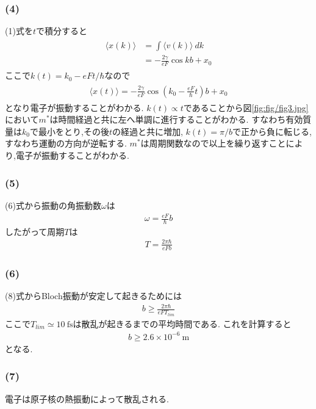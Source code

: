 \documentclass[uplatex,a4j,11pt,dvipdfmx]{jsarticle}
\begin{document}
\subsubsection*{(4)}
(1)式を$t$で積分すると
\begin{align}
  \begin{split}
    \langle x(k)\rangle&=\int\langle v(k)\rangle\ dk\\
    &=-\frac{2\gamma}{eF}\cos kb+x_0
  \end{split}
\end{align}
ここで$k(t)=k_0-eFt/\hbar$なので
\begin{align}
  \begin{split}
    \langle x(t)\rangle=-\frac{2\gamma}{eF}\cos \left(k_0-\frac{eF}{\hbar}t\right)b+x_0
  \end{split}
\end{align}
となり電子が振動することがわかる.
$k(t)\propto t$であることから図\ref{fig:fig/fig3.jpg}において$m^*$は時間経過と共に左へ単調に進行することがわかる.
すなわち有効質量は$k_0$で最小をとり,その後$t$の経過と共に増加,
$k(t)=\pi/b$で正から負に転じる,すなわち運動の方向が逆転する.
$m^*$は周期関数なので以上を繰り返すことにより,電子が振動することがわかる.
\subsubsection*{(5)}
(6)式から振動の角振動数$\omega$は
\begin{align}
  \omega=\frac{eF}{\hbar}b
\end{align}
したがって周期$T$は
\begin{align}
  T=\frac{2\pi\hbar}{eFb}
\end{align}
\subsubsection*{(6)}
(8)式からBloch振動が安定して起きるためには
\begin{align}
  b\geq\frac{2\pi\hbar}{eFT_{lim}}
\end{align}
ここで$T_{lim}\simeq 10\ \si{\femto\second}$は散乱が起きるまでの平均時間である.
これを計算すると
\begin{align}
  b\geq2.6\times10^{-6}\ \si{\metre}
\end{align}
となる.
\subsubsection*{(7)}
電子は原子核の熱振動によって散乱される.

\end{document}
